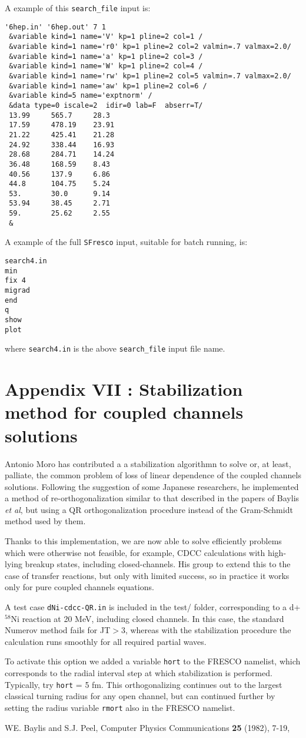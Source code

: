 \documentclass[11pt]{article}
\begin{document}
\newpage
A example of this {\tt search\_file} input is:
\begin{verbatim}
'6hep.in' '6hep.out' 7 1
 &variable kind=1 name='V' kp=1 pline=2 col=1 /
 &variable kind=1 name='r0' kp=1 pline=2 col=2 valmin=.7 valmax=2.0/
 &variable kind=1 name='a' kp=1 pline=2 col=3 /
 &variable kind=1 name='W' kp=1 pline=2 col=4 /
 &variable kind=1 name='rw' kp=1 pline=2 col=5 valmin=.7 valmax=2.0/
 &variable kind=1 name='aw' kp=1 pline=2 col=6 /
 &variable kind=5 name='exptnorm' /
 &data type=0 iscale=2  idir=0 lab=F  abserr=T/
 13.99     565.7     28.3
 17.59     478.19    23.91
 21.22     425.41    21.28
 24.92     338.44    16.93
 28.68     284.71    14.24
 36.48     168.59    8.43
 40.56     137.9     6.86
 44.8      104.75    5.24
 53.       30.0      9.14
 53.94     38.45     2.71
 59.       25.62     2.55
 &
\end{verbatim}
\normalsize
A example of the full {\tt SFresco} input, suitable for batch running, is:
\begin{verbatim}
search4.in
min
fix 4
migrad
end
q
show
plot
\end{verbatim}
\normalsize
where {\tt search4.in} is the above {\tt search\_file} input file name.

\newpage
\section*{Appendix VII : Stabilization method for coupled channels solutions}
\parskip 6pt

Antonio Moro has contributed a 
a stabilization algorithmn to solve or, at least, palliate, the common problem of loss of linear dependence of the coupled channels solutions. Following the suggestion of some Japanese researchers, he implemented a method of re-orthogonalization similar to that described in the papers of Baylis {\em et al}, but using a QR orthogonalization procedure instead of the Gram-Schmidt method used by them.

Thanks to this implementation, we are now able to solve efficiently problems which were otherwise not feasible, for example, CDCC calculations with high-lying breakup states, including closed-channels. His group to extend this to the case of transfer reactions, but only with limited success, so in practice it works only for pure coupled channels equations.

A test case {\tt dNi-cdcc-QR.in} is included in the test/ folder, corresponding to a d+$^{58}$Ni reaction at 20 MeV, including closed channels. In this case, the standard Numerov method fails for JT$>$3, whereas with the stabilization procedure the calculation runs smoothly for all required partial waves. 

To activate this option we added a variable {\tt hort} to the FRESCO namelist, which corresponds to the radial interval step at which stabilization is performed. Typically, try {\tt hort} = 5 fm. 
This orthogonalizing continues out to the largest classical turning radius for any open channel, but can continued further by setting the radius variable {\tt rmort} also in the FRESCO namelist.

WE. Baylis and S.J. Peel, Computer Physics Communications {\bf 25} (1982), 7-19, 
\end{document}

